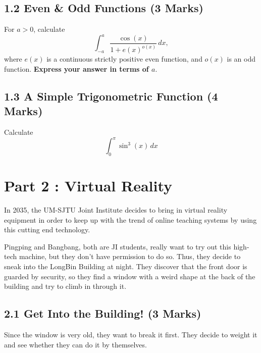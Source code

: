 \documentclass[12pt]{article}
\begin{document}
\subsection*{1.2 Even \& Odd Functions (3 Marks)}
\noindent For $a>0$, calculate
\begin{equation*}
    \int^a_{-a} \frac{\cos(x)}{1 + e(x)^{o(x)}}\,dx, 
\end{equation*}
where $e(x)$ is a continuous strictly positive even function, and $o(x)$ is an odd function. \textbf{Express your answer in terms of $a$}. 

\subsection*{1.3 A Simple Trigonometric Function (4 Marks)}
\noindent Calculate 
\begin{equation*}
    \int^\pi_0 \sin^3(x)\,dx
\end{equation*}

\newpage
\section*{Part 2 : Virtual Reality}

In 2035, the UM-SJTU Joint Institute decides to bring in virtual reality equipment in order to keep up with the trend of online 
teaching systems by using this cutting end technology.

Pingping and Bangbang, both are JI students, really want to try out this high-tech machine, but they don't have
permission to do so. Thus, they decide to sneak into the LongBin Building at night. They discover that the front door is 
guarded by security, so they find a window with a weird shape at the back of the building and try to
climb in through it. 

\subsection*{2.1 Get Into the Building! (3 Marks)}

Since the window is very old, they want to break it first. They decide to weight it and see whether 
they can do it by themselves. 
\end{document}
